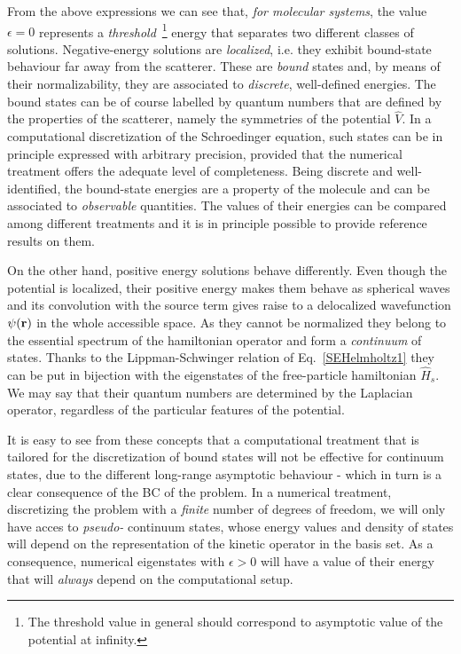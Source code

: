 \documentclass[reprint,aps,prb]{revtex4-1}
\renewcommand{\r}{{\bf r}}
\newcommand{\op}[1]{\hat {#1}}
\begin{document}
From the above expressions we can see that, \emph{for molecular systems},
the value $\epsilon=0$
represents a \emph{threshold}~\footnote{The threshold value in general should correspond to asymptotic value of the potential at infinity.} 
energy that separates two different classes of solutions.
Negative-energy solutions are \emph{localized}, i.e. they exhibit bound-state behaviour far away from the scatterer.
These are \emph{bound} states and, by means of their normalizability, they are associated to \emph{discrete}, well-defined energies.
The bound states can be of course labelled by quantum numbers that are defined by the properties of the scatterer, namely the
symmetries of the potential $\op V$.
In a computational discretization of the Schroedinger equation, such states can be in principle expressed with arbitrary precision, 
provided that the numerical treatment offers the adequate level of completeness. 
Being discrete and well-identified, the bound-state energies are a property of the molecule and can be associated to \emph{observable}
quantities. The values of their energies can be compared among different treatments and it is in principle possible to
provide reference results on them.


On the other hand, positive energy solutions behave differently. 
Even though the potential is localized, their positive energy makes them behave 
as spherical waves and its convolution with the source term  gives raise to a delocalized wavefunction $\psi(\r)$ 
in the whole accessible space.
As they cannot be normalized they belong to the essential spectrum of the hamiltonian operator and form a \emph{continuum} of states.
Thanks to the Lippman-Schwinger relation of Eq.~\eqref{SEHelmholtz1} they can be put in bijection with the eigenstates of the 
free-particle hamiltonian $\op H_s$. We may say that their quantum numbers are determined by the Laplacian operator, 
regardless of the particular features of the potential.

It is easy to see from these concepts that a computational treatment that is tailored for the discretization of bound states
will not be effective for continuum states, due to the different long-range asymptotic behaviour - which in turn is a clear consequence of the 
BC of the problem. In a numerical treatment, discretizing the problem with a \emph{finite}
number of degrees of freedom, we will only have acces to \emph{pseudo-} continuum states,
whose energy values and density of states will depend on the representation of the kinetic operator
in the basis set. As a consequence, numerical eigenstates with $\epsilon > 0$ will have a value of their energy that will \emph{always}
depend on the computational setup.
\end{document}

